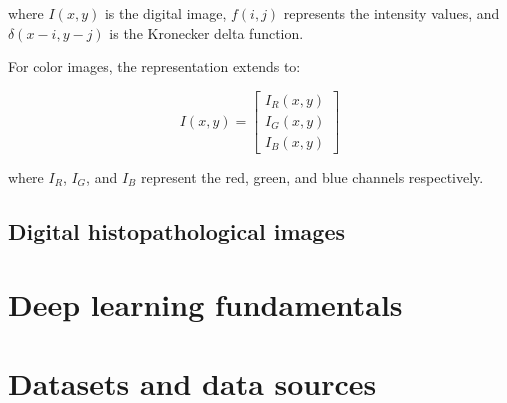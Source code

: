 where $I(x,y)$ is the digital image, $f(i,j)$ represents the
intensity values, and $\delta(x-i, y-j)$ is the Kronecker delta function.

For color images, the representation extends to:

\begin{equation}
  I(x,y) =
  \begin{bmatrix}
    I_R(x,y) \\
    I_G(x,y) \\
    I_B(x,y)
  \end{bmatrix}
\end{equation}

where $I_R$, $I_G$, and $I_B$ represent the red, green, and blue
channels respectively.

\subsection{Digital histopathological images}

\section{Deep learning fundamentals}

\section{Datasets and data sources}
